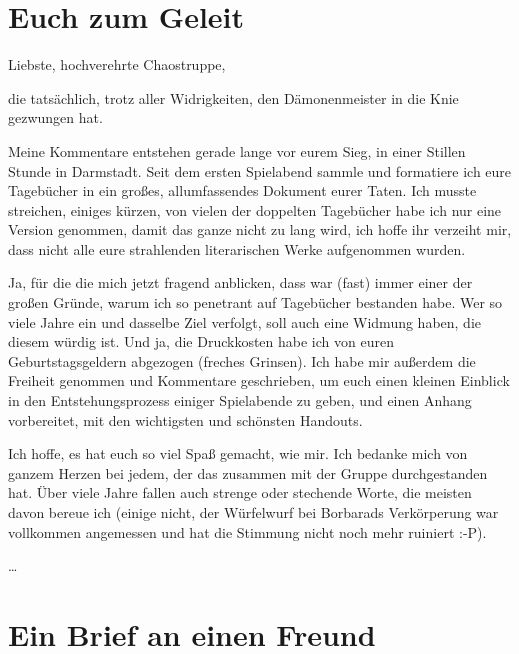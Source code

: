 \chapter{Euch zum Geleit}
Liebste, hochverehrte Chaostruppe, 

die tatsächlich, trotz aller Widrigkeiten, den Dämonenmeister in die Knie gezwungen hat.\par\medskip

Meine Kommentare entstehen gerade lange vor eurem Sieg, in einer Stillen Stunde in Darmstadt. Seit dem ersten Spielabend sammle und formatiere ich eure Tagebücher in ein großes, allumfassendes Dokument eurer Taten. Ich musste streichen, einiges kürzen, von vielen der doppelten Tagebücher habe ich nur eine Version genommen, damit das ganze nicht zu lang wird, ich hoffe ihr verzeiht mir, dass nicht alle eure strahlenden literarischen Werke aufgenommen wurden.\par\medskip

Ja, für die die mich jetzt fragend anblicken, dass war (fast) immer einer der großen Gründe, warum ich so penetrant auf Tagebücher bestanden habe. Wer so viele Jahre ein und dasselbe Ziel verfolgt, soll auch eine Widmung haben, die diesem würdig ist. Und ja, die Druckkosten habe ich von euren Geburtstagsgeldern abgezogen (freches Grinsen). Ich habe mir außerdem die Freiheit genommen und Kommentare geschrieben, um euch einen kleinen Einblick in den Entstehungsprozess einiger Spielabende zu geben, und einen Anhang vorbereitet, mit den wichtigsten und schönsten Handouts.\par\medskip

Ich hoffe, es hat euch so viel Spaß gemacht, wie mir. Ich bedanke mich von ganzem Herzen bei jedem, der das zusammen mit der Gruppe durchgestanden hat. Über viele Jahre fallen auch strenge oder stechende Worte, die meisten davon bereue ich (einige nicht, der Würfelwurf bei Borbarads Verkörperung war vollkommen angemessen und hat die Stimmung nicht noch mehr ruiniert :-P).\par\medskip
\dots

\chapter{Ein Brief an einen Freund}


